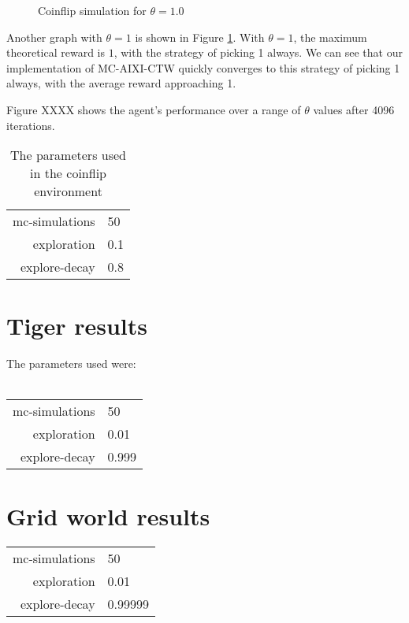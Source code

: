 \documentclass[pdftex,twoside,a4paper]{report}
\newcommand{\mac}{MC-AIXI-CTW}
\begin{document}
\begin{figure}
\centering
\caption{Coinflip simulation for $\theta=1.0$}
\label{fig:coin_1_0}
\end{figure}
Another graph with $\theta = 1$ is shown in Figure \ref{fig:coin_1_0}. With $\theta = 1$, the maximum theoretical reward is $1$, with the strategy of picking 1 always. We can see that our implementation of \mac{} quickly converges to this strategy of picking 1 always, with the average reward approaching 1.

Figure XXXX shows the agent's performance over a range of $\theta$ values after 4096 iterations.

\begin{table}
\centering
\begin{tabular}[H]{| r | l | }
\hline
mc-simulations & 50\\
exploration & 0.1\\
explore-decay & 0.8\\
\hline
\end{tabular}
\caption{The parameters used in the coinflip environment}
\end{table}
\section{Tiger results}
The parameters used were:\\\\
\begin{tabular}{| r | l | }
\hline
mc-simulations & 50\\
exploration & 0.01\\
explore-decay & 0.999\\
\hline
\end{tabular}
\section{Grid world results}

\begin{tabular}{| r | l | }
\hline
mc-simulations & 50\\
exploration & 0.01\\
explore-decay & 0.99999\\
\hline
\end{tabular}
\end{document}
